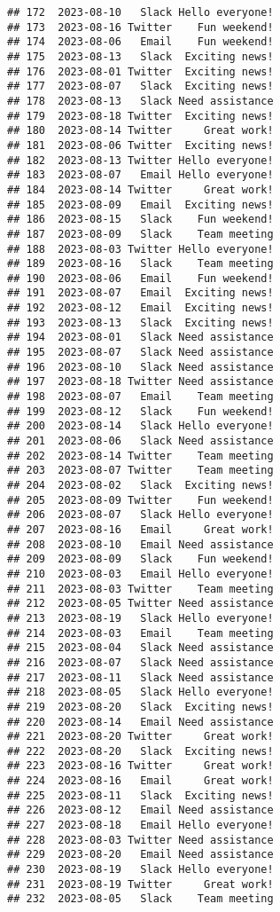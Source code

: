 \documentclass[
]{article}
\begin{document}
\begin{verbatim}
## 172  2023-08-10   Slack Hello everyone!
## 173  2023-08-16 Twitter    Fun weekend!
## 174  2023-08-06   Email    Fun weekend!
## 175  2023-08-13   Slack  Exciting news!
## 176  2023-08-01 Twitter  Exciting news!
## 177  2023-08-07   Slack  Exciting news!
## 178  2023-08-13   Slack Need assistance
## 179  2023-08-18 Twitter  Exciting news!
## 180  2023-08-14 Twitter     Great work!
## 181  2023-08-06 Twitter  Exciting news!
## 182  2023-08-13 Twitter Hello everyone!
## 183  2023-08-07   Email Hello everyone!
## 184  2023-08-14 Twitter     Great work!
## 185  2023-08-09   Email  Exciting news!
## 186  2023-08-15   Slack    Fun weekend!
## 187  2023-08-09   Slack    Team meeting
## 188  2023-08-03 Twitter Hello everyone!
## 189  2023-08-16   Slack    Team meeting
## 190  2023-08-06   Email    Fun weekend!
## 191  2023-08-07   Email  Exciting news!
## 192  2023-08-12   Email  Exciting news!
## 193  2023-08-13   Slack  Exciting news!
## 194  2023-08-01   Slack Need assistance
## 195  2023-08-07   Slack Need assistance
## 196  2023-08-10   Slack Need assistance
## 197  2023-08-18 Twitter Need assistance
## 198  2023-08-07   Email    Team meeting
## 199  2023-08-12   Slack    Fun weekend!
## 200  2023-08-14   Slack Hello everyone!
## 201  2023-08-06   Slack Need assistance
## 202  2023-08-14 Twitter    Team meeting
## 203  2023-08-07 Twitter    Team meeting
## 204  2023-08-02   Slack  Exciting news!
## 205  2023-08-09 Twitter    Fun weekend!
## 206  2023-08-07   Slack Hello everyone!
## 207  2023-08-16   Email     Great work!
## 208  2023-08-10   Email Need assistance
## 209  2023-08-09   Slack    Fun weekend!
## 210  2023-08-03   Email Hello everyone!
## 211  2023-08-03 Twitter    Team meeting
## 212  2023-08-05 Twitter Need assistance
## 213  2023-08-19   Slack Hello everyone!
## 214  2023-08-03   Email    Team meeting
## 215  2023-08-04   Slack Need assistance
## 216  2023-08-07   Slack Need assistance
## 217  2023-08-11   Slack Need assistance
## 218  2023-08-05   Slack Hello everyone!
## 219  2023-08-20   Slack  Exciting news!
## 220  2023-08-14   Email Need assistance
## 221  2023-08-20 Twitter     Great work!
## 222  2023-08-20   Slack  Exciting news!
## 223  2023-08-16 Twitter     Great work!
## 224  2023-08-16   Email     Great work!
## 225  2023-08-11   Slack  Exciting news!
## 226  2023-08-12   Email Need assistance
## 227  2023-08-18   Email Hello everyone!
## 228  2023-08-03 Twitter Need assistance
## 229  2023-08-20   Email Need assistance
## 230  2023-08-19   Slack Hello everyone!
## 231  2023-08-19 Twitter     Great work!
## 232  2023-08-05   Slack    Team meeting

\end{verbatim}
\end{document}
